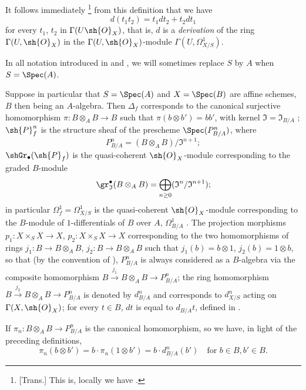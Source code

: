 It follows immediately
\footnote{
[Trans.] This is, locally we have .
}
from this definition that we have
\[
  \label{IV.16.3.6.1}
  d(t_1 t_2) = t_1 dt_2 + t_2 dt_1
  \tag{16.3.6.1} 
\]
for every $t_1$, $t_2$ in $\Gamma(U \sh{O}_X)$, that is, $d$ is a \emph{derivation} of the ring $\Gamma(U, \sh{O}_X)$ in the $\Gamma(U, \sh{O}_X)$-module $\Gamma(U, \Omega_{X/S}^1)$.

In all notation introduced in  and , we will sometimes replace $S$ by $A$ when $S = \Spec(A)$.

\begin{env}[16.3.7]
\label{IV.16.3.7}
Suppose in particular that $S = \Spec(A)$ and $X = \Spec(B)$ are affine schemes, $B$ then being an $A$-algebra.
Then $\Delta_f$ corresponds to the canonical surjective homomorphism $\pi: B \otimes_A B \to B$ such that $\pi(b\otimes b') = bb'$, with kernel $\mathfrak{I} = \mathfrak{I}_{B/A}$ ;
$\sh{P}_{f}^n$ is the structure sheaf of the prescheme $\Spec(P_{B/A}^n)$, where
\[
  P_{B/A}^n = (B \otimes_A B)/\mathfrak{I}^{n+1};
\]
$\shGr_\bullet(\sh{P}_f)$ is the quasi-coherent $\sh{O}_X$-module corresponding to the graded $B$-module
\[
  \gr_\mathfrak{I}^\bullet(B \otimes_A B) = \bigoplus_{n \geq 0} (\mathfrak{I}^n/\mathfrak{I}^{n+1});
\]
in particular $\Omega_f^1 = \Omega_{X/S}^1$ is the quasi-coherent $\sh{O}_X$-module corresponding to the $B$-module of $1$-differentials of $B$ over $A$, $\Omega_{B/A}^1$ .
The projection morphisms $p_1: X \times_S X \to X$, $p_2: X \times_S X \to X$ corresponding to the two homomorphisms of rings $j_1: B \to B \otimes_A B$, $j_2: B \to B \otimes_A B$ such that $j_1(b) = b \otimes 1$, $j_2(b) = 1 \otimes b$, so that (by the convention of ), $P_{B/A}^n$ is always considered as a $B$-algebra via the composite homomorphism $B \xrightarrow{j_1} B \otimes_A B \to P_{B/A}^n$;
the ring homomorphism $B \xrightarrow{j_2} B \otimes_A B \to P_{B/A}^n$ is denoted by $d_{B/A}^n$ and corresponds to $d_{X/S}^n$ acting on $\Gamma(X, \sh{O}_X)$;
for every $t \in B$, $dt$ is equal to $d_{B/A}t$, defined in .

If $\pi_n: B \otimes_A B \to P_{B/A}^n$ is the canonical homomorphism, so we have, in light of the preceding definitions,
\[
  \label{IV.16.3.7.1}
  \pi_n(b\otimes b') = b \cdot \pi_n(1\otimes b') = b \cdot d_{B/A}^n(b') \quad \text{for } b \in B, b' \in B.
  \tag{16.3.7.1}
\]
\end{env}

